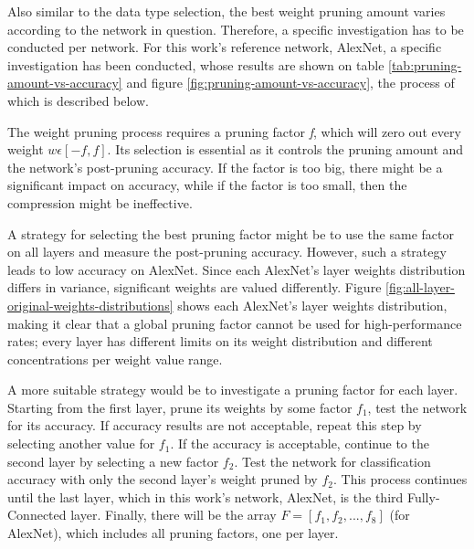 Also similar to the data type selection, the best weight pruning amount varies according to the network in question. Therefore, a specific investigation has to be conducted per network. For this work's reference network, AlexNet, a specific investigation has been conducted, whose results are shown on table \ref{tab:pruning-amount-vs-accuracy} and figure \ref{fig:pruning-amount-vs-accuracy}, the process of which is described below.

The weight pruning process requires a pruning factor \emph{f}, which will zero out every weight $w \epsilon [-f, f]$. Its selection is essential as it controls the pruning amount and the network's post-pruning accuracy. If the factor is too big, there might be a significant impact on accuracy, while if the factor is too small, then the compression might be ineffective.

A strategy for selecting the best pruning factor might be to use the same factor on all layers and measure the post-pruning accuracy. However, such a strategy leads to low accuracy on AlexNet. Since each AlexNet's layer weights distribution differs in variance, significant weights are valued differently. Figure \ref{fig:all-layer-original-weights-distributions} shows each AlexNet's layer weights distribution, making it clear that a global pruning factor cannot be used for high-performance rates; every layer has different limits on its weight distribution and different concentrations per weight value range.

A more suitable strategy would be to investigate a pruning factor for each layer. Starting from the first layer, prune its weights by some factor $f_1$, test the network for its accuracy. If accuracy results are not acceptable, repeat this step by selecting another value for $f_1$. If the accuracy is acceptable, continue to the second layer by selecting a new factor $f_2$. Test the network for classification accuracy with only the second layer's weight pruned by $f_2$. This process continues until the last layer, which in this work's network, AlexNet, is the third Fully-Connected layer. Finally, there will be the array $F = [f_1, f_2, ..., f_8]$ (for AlexNet), which includes all pruning factors, one per layer.

